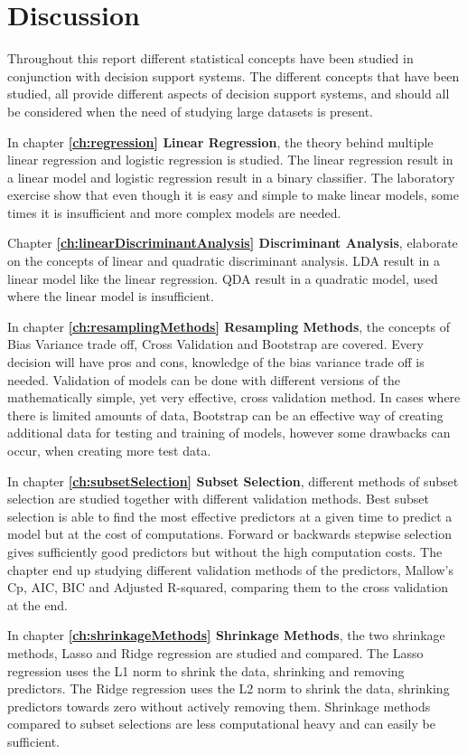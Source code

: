 \chapter{Discussion} \label{ch:discussion}
Throughout this report different statistical concepts have been studied in conjunction with decision support systems. The different concepts that have been studied, all provide different aspects of decision support systems, and should all be considered when the need of studying large datasets is present.

In chapter \textbf{\ref{ch:regression} Linear Regression}, the theory behind multiple linear regression and logistic regression is studied. The linear regression result in a linear model and logistic regression result in a binary classifier. The laboratory exercise show that even though it is easy and simple to make linear models, some times it is insufficient and more complex models are needed.

Chapter \textbf{\ref{ch:linearDiscriminantAnalysis} Discriminant Analysis}, elaborate on the concepts of linear and quadratic discriminant analysis. LDA result in a linear model like the linear regression. QDA result in a quadratic model, used where the linear model is insufficient.

In chapter \textbf{\ref{ch:resamplingMethods} Resampling Methods}, the concepts of Bias Variance trade off, Cross Validation and Bootstrap are covered. Every decision will have pros and cons, knowledge of the bias variance trade off is needed. Validation of models can be done with different versions of the mathematically simple, yet very effective, cross validation method. In cases where there is limited amounts of data, Bootstrap can be an effective way of creating additional data for testing and training of models, however some drawbacks can occur, when creating more test data.

In chapter \textbf{\ref{ch:subsetSelection} Subset Selection}, different methods of subset selection are studied together with different validation methods. Best subset selection is able to find the most effective predictors at a given time to predict a model but at the cost of computations. Forward or backwards stepwise selection gives sufficiently good predictors but without the high computation costs. The chapter end up studying different validation methods of the predictors, Mallow's Cp, AIC, BIC and Adjusted R-squared, comparing them to the cross validation at the end.

In chapter \textbf{\ref{ch:shrinkageMethods} Shrinkage Methods}, the two shrinkage methods, Lasso and Ridge regression are studied and compared. The Lasso regression uses the L1 norm to shrink the data, shrinking and removing predictors. The Ridge regression uses the L2 norm to shrink the data, shrinking predictors towards zero without actively removing them. Shrinkage methods compared to subset selections are less computational heavy and can easily be sufficient.

